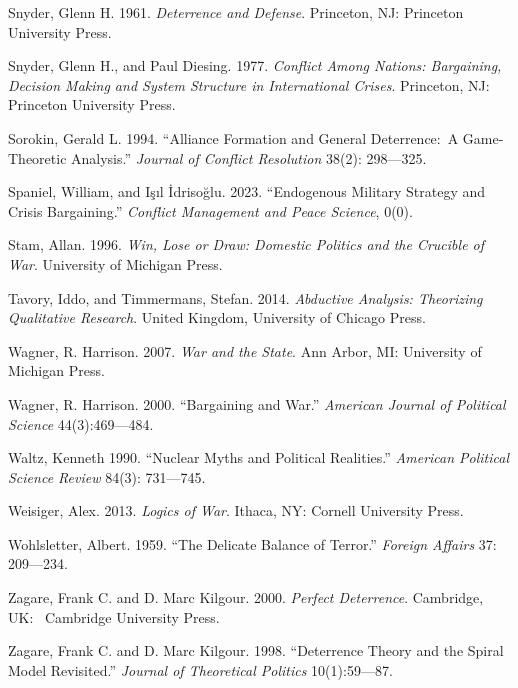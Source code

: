 \documentclass[
  letterpaper,
  DIV=11,
  numbers=noendperiod]{scrartcl}
\begin{document}
Snyder, Glenn H. 1961. \emph{Deterrence and Defense}. Princeton, NJ:
Princeton University Press.

Snyder, Glenn H., and Paul Diesing. 1977. \emph{Conflict Among Nations:
Bargaining, Decision Making and System Structure in International
Crises}. Princeton, NJ: Princeton University Press.

Sorokin, Gerald L. 1994. ``Alliance Formation and General Deterrence:~A
Game-Theoretic Analysis.'' \emph{Journal of Conflict Resolution} 38(2):
298---325.

Spaniel, William, and Işıl İdrisoğlu. 2023. ``Endogenous Military
Strategy and Crisis Bargaining.'' \emph{Conflict Management and Peace
Science}, 0(0).

Stam, Allan. 1996. \emph{Win, Lose or Draw: Domestic Politics and the
Crucible of War}. University of Michigan Press.

Tavory, Iddo, and Timmermans, Stefan. 2014. \emph{Abductive Analysis:
Theorizing Qualitative Research}. United Kingdom, University of Chicago
Press.

Wagner, R. Harrison. 2007. \emph{War and the State}. Ann Arbor, MI:
University of Michigan Press.

Wagner, R. Harrison. 2000. ``Bargaining and War.'' \emph{American
Journal of Political Science} 44(3):469---484.~

Waltz, Kenneth 1990. ``Nuclear Myths and Political Realities.''
\emph{American Political Science Review} 84(3): 731---745.~

Weisiger, Alex. 2013. \emph{Logics of War}. Ithaca, NY: Cornell
University Press.~

Wohlsletter, Albert. 1959. ``The Delicate Balance of Terror.''
\emph{Foreign Affairs} 37: 209---234.

Zagare, Frank C. and D. Marc Kilgour. 2000. \emph{Perfect Deterrence}.
Cambridge, UK:~ Cambridge University Press.

Zagare, Frank C. and D. Marc Kilgour. 1998. ``Deterrence Theory and the
Spiral Model Revisited.'' \emph{Journal of Theoretical Politics}
10(1):59---87.
\end{document}
